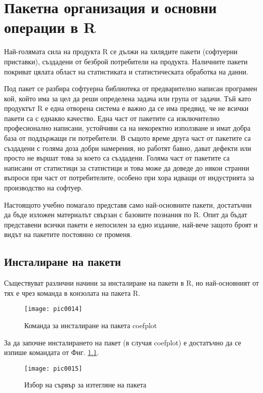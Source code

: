 \newpage
\chapter{Пакетна организация и основни операции в R}
\label{chapter02}

Най-голямата сила на продукта R се дължи на хилядите пакети (софтуерни приставки), създадени от безброй потребители на продукта. Наличните пакети покриват цялата област на статистиката и статистическата обработка на данни. 

Под пакет се разбира софтуерна библиотека от предварително написан програмен кой, който има за цел да реши определена задача или група от задачи. Тъй като продуктът R е една отворена система е важно да се има предвид, че не всички пакети са с еднакво качество. Една част от пакетите са изключително професионално написани, устойчиви са на некоректно използване и имат добра база от поддържащи ги потребители. В същото време друга част от пакетите са създадени с голяма доза добри намерения, но работят бавно, дават дефекти или просто не вършат това за което са създадени. Голяма част от пакетите са написани от статистици за статистици и това може да доведе до някои странни въпроси при част от потребителите, особено при хора идващи от индустрията за производство на софтуер. 

Настоящото учебно помагало представя само най-основните пакети, достатъчни да бъде изложен материалът свързан с базовите познания по R. Опит да бъдат представени всички пакети е непосилен за едно издание, най-вече защото броят и видът на пакетите постоянно се променя. 

\section{Инсталиране на пакети}

Съществуват различни начини за инсталиране на пакети в R, но най-основният от тях е чрез команда в конзолата на пакета R. 

\begin{figure}[h!]
  \centering
  \texttt{[image: pic0014]}
  \caption{Команда за инсталиране на пакета coefplot}
\label{fig:pic0014}
\end{figure}
\FloatBarrier

За да започне инсталирането на пакет (в случая coefplot) е достатъчно да се изпише командата от Фиг. \ref{fig:pic0014}.

\begin{figure}[h!]
  \centering
  \texttt{[image: pic0015]}
  \caption{Избор на сървър за изтегляне на пакета}
\label{fig:pic0015}
\end{figure}
\FloatBarrier


